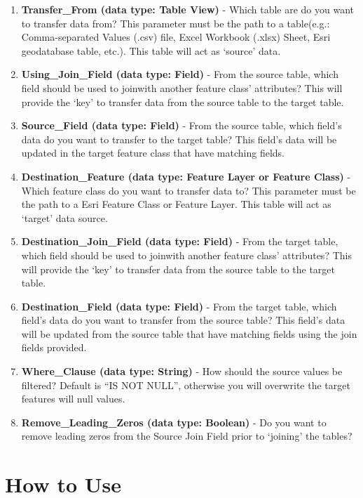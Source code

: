\documentclass[openany]{book}
\theoremstyle{definition}
\theoremstyle{definition}
\theoremstyle{definition}
\theoremstyle{remark}
\begin{document}
\begin{enumerate}
\def\labelenumi{\arabic{enumi}.}
\item
  \textbf{Transfer\_From (data type: Table View)} - Which table are do
  you want to transfer data from? This parameter must be the path to a
  table(e.g.: Comma-separated Values (.csv) file, Excel Workbook (.xlsx)
  Sheet, Esri geodatabase table, etc.). This table will act as `source'
  data.
\item
  \textbf{Using\_Join\_Field (data type: Field)} - From the source
  table, which field should be used to joinwith another feature class'
  attributes? This will provide the `key' to transfer data from the
  source table to the target table.
\item
  \textbf{Source\_Field (data type: Field)} - From the source table,
  which field's data do you want to transfer to the target table? This
  field's data will be updated in the target feature class that have
  matching fields.
\item
  \textbf{Destination\_Feature (data type: Feature Layer or Feature
  Class)} - Which feature class do you want to transfer data to? This
  parameter must be the path to a Esri Feature Class or Feature Layer.
  This table will act as `target' data source.
\item
  \textbf{Destination\_Join\_Field (data type: Field)} - From the target
  table, which field should be used to joinwith another feature class'
  attributes? This will provide the `key' to transfer data from the
  source table to the target table.
\item
  \textbf{Destination\_Field (data type: Field)} - From the target
  table, which field's data do you want to transfer from the source
  table? This field's data will be updated from the source table that
  have matching fields using the join fields provided.
\item
  \textbf{Where\_Clause (data type: String)} - How should the source
  values be filtered? Default is ``IS NOT NULL'', otherwise you will
  overwrite the target features will null values.
\item
  \textbf{Remove\_Leading\_Zeros (data type: Boolean)} - Do you want to
  remove leading zeros from the Source Join Field prior to `joining' the
  tables?
\end{enumerate}

\section{How to Use}\label{how-to-use-1}
\end{document}
